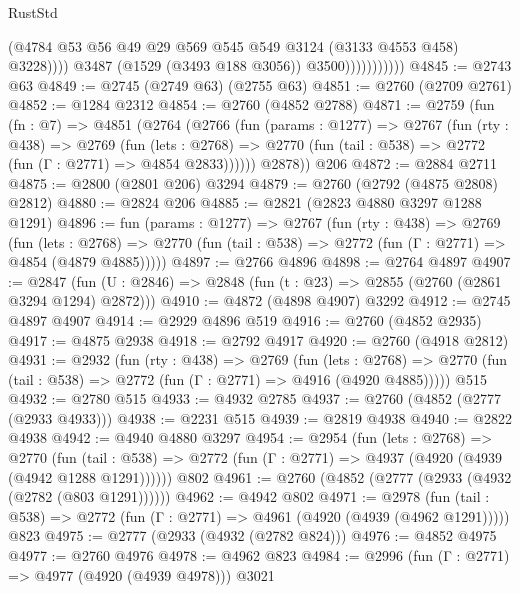 \begin{lexlean}{RustStd}
\begin{coremodule}
                                (@4784
                                  @53
                                  @56
                                  @49
                                  @29
                                  @569
                                  @545
                                  @549
                                  @3124
                                  (@3133 @4553 @458)
                                  @3228))))
                          @3487
                          (@1529 (@3493 @188 @3056))
                          @3500)))))))))))
@4845 := @2743 @63
@4849 := @2745 (@2749 @63) (@2755 @63)
@4851 := @2760 (@2709 @2761)
@4852 := @1284 @2312
@4854 := @2760 (@4852 @2788)
@4871 := @2759
    (fun (fn : @7) =>
    @4851
      (@2764
        (@2766
          (fun (params : @1277) =>
          @2767
            (fun (rty : @438) =>
            @2769
              (fun (lets : @2768) =>
              @2770 (fun (tail : @538) => @2772 (fun (Γ : @2771) => @4854 @2833))))))
        @2878))
    @206
@4872 := @2884 @2711
@4875 := @2800 (@2801 @206) @3294
@4879 := @2760 (@2792 (@4875 @2808) @2812)
@4880 := @2824 @206
@4885 := @2821 (@2823 @4880 @3297 @1288 @1291)
@4896 := fun (params : @1277) =>
  @2767
    (fun (rty : @438) =>
    @2769
      (fun (lets : @2768) =>
      @2770 (fun (tail : @538) => @2772 (fun (Γ : @2771) => @4854 (@4879 @4885)))))
@4897 := @2766 @4896
@4898 := @2764 @4897
@4907 := @2847 (fun (U : @2846) => @2848 (fun (t : @23) => @2855 (@2760 (@2861 @3294 @1294) @2872)))
@4910 := @4872 (@4898 @4907) @3292
@4912 := @2745 @4897 @4907
@4914 := @2929 @4896 @519
@4916 := @2760 (@4852 @2935)
@4917 := @4875 @2938
@4918 := @2792 @4917
@4920 := @2760 (@4918 @2812)
@4931 := @2932
    (fun (rty : @438) =>
    @2769
      (fun (lets : @2768) =>
      @2770 (fun (tail : @538) => @2772 (fun (Γ : @2771) => @4916 (@4920 @4885)))))
    @515
@4932 := @2780 @515
@4933 := @4932 @2785
@4937 := @2760 (@4852 (@2777 (@2933 @4933)))
@4938 := @2231 @515
@4939 := @2819 @4938
@4940 := @2822 @4938
@4942 := @4940 @4880 @3297
@4954 := @2954
    (fun (lets : @2768) =>
    @2770
      (fun (tail : @538) => @2772 (fun (Γ : @2771) => @4937 (@4920 (@4939 (@4942 @1288 @1291))))))
    @802
@4961 := @2760 (@4852 (@2777 (@2933 (@4932 (@2782 (@803 @1291))))))
@4962 := @4942 @802
@4971 := @2978
    (fun (tail : @538) => @2772 (fun (Γ : @2771) => @4961 (@4920 (@4939 (@4962 @1291)))))
    @823
@4975 := @2777 (@2933 (@4932 (@2782 @824)))
@4976 := @4852 @4975
@4977 := @2760 @4976
@4978 := @4962 @823
@4984 := @2996 (fun (Γ : @2771) => @4977 (@4920 (@4939 @4978))) @3021

\end{coremodule}
\end{lexlean}
